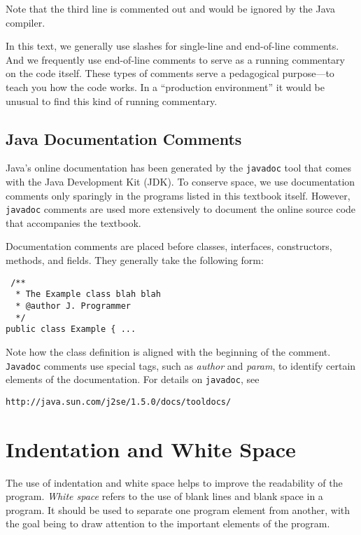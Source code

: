 \noindent Note that the third line is commented out and
would be ignored by the Java compiler.

In this text, we generally use slashes for single-line and end-of-line
comments.  And we frequently use end-of-line comments to serve as a
running commentary on the code itself.  These types of comments serve a
pedagogical purpose---to teach you how the code works.  In a
``production environment'' it would be unusual to find this kind of
running commentary.

\subsection*{Java Documentation Comments}
\noindent Java's online documentation has been generated by the {\tt javadoc}
tool that comes with the Java Development Kit (JDK). To conserve
space, we use documentation comments only sparingly in the programs
listed in this textbook itself.  However, {\tt javadoc} comments are
used more extensively to document the online source code that accompanies
the textbook.

Documentation comments are placed before classes, interfaces,
constructors, methods, and fields.  They generally take the
following form:

\begin{jjjlisting}
\begin{lstlisting}
 /**
  * The Example class blah blah
  * @author J. Programmer
  */
public class Example { ...
\end{lstlisting}
\end{jjjlisting}

\noindent Note how the class definition is aligned with the beginning of the
comment.  {\tt Javadoc} comments use special tags, such as {\it author} and
{\it param}, to identify certain elements of the documentation.  For details
on {\tt javadoc}, see

\begin{jjjlisting}
\begin{lstlisting}[commentstyle=\color{black}]
http://java.sun.com/j2se/1.5.0/docs/tooldocs/
\end{lstlisting}
\end{jjjlisting}

\section*{Indentation and White Space}
\noindent The use of indentation and white space helps to improve the
readability of the program.   {\it White space} refers to the use of
blank lines and blank space in a program.  It should be used to
separate one program element from another, with the goal being to draw
attention to the important elements of the program.

